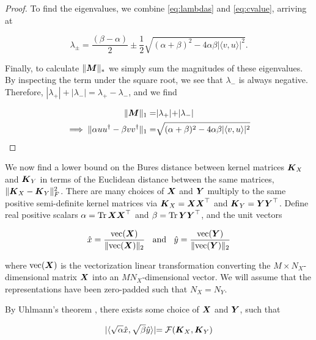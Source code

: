 \begin{proof}
To find the eigenvalues, we combine  \cref{eq:lambdas} and \cref{eq:cvalue}, arriving at 

\begin{equation}\label{eq:rank1-eigenvalues}
\lambda_{\pm} = \frac{(\beta - \alpha)}{2} \pm \frac{1}{2} \sqrt{(\alpha + \beta)^2 - 4 \alpha \beta \lvert \langle v,u \rangle \lvert^2}.
\end{equation}

Finally, to calculate $\| \boldsymbol{M}\|_*$ we simply sum the magnitudes of these eigenvalues. 
By inspecting the term under the square root, we see that $\lambda_-$ is always negative.  
Therefore, $|\lambda_+| + |\lambda_-| = \lambda_+ - \lambda_-$, and we find

\begin{equation}
\begin{split}
\| \boldsymbol{M}\|_1 =& \lvert \lambda_+ \lvert + \lvert \lambda_- \lvert \\
\implies \| \alpha u u^{\dag} - \beta v v^{\dag} \|_1 =& \sqrt{(\alpha + \beta)^2 - 4 \alpha \beta \lvert \langle v,u \rangle \lvert^2}
\end{split}
\end{equation}
\end{proof}

We now find a lower bound on the Bures distance between kernel matrices $\boldsymbol{K}_X$ and $\boldsymbol{K}_Y$ in terms of the Euclidean distance between the same matrices, $\|\boldsymbol{K}_X - \boldsymbol{K}_Y \|_F^2 $.
There are many choices of $\boldsymbol{X}$ and $\boldsymbol{Y}$ multiply to the same positive semi-definite kernel matrices via $\boldsymbol{K}_X = \boldsymbol{X} \boldsymbol{X}^\top$ and $\boldsymbol{K}_Y = \boldsymbol{Y} \boldsymbol{Y}^\top$.
Define real positive scalars $\alpha = \operatorname*{Tr} \boldsymbol{X} \boldsymbol{X}^\top$ and $\beta = \operatorname*{Tr} \boldsymbol{Y} \boldsymbol{Y}^\top$, and the unit vectors 

\begin{equation}
    \hat{x} = \frac{\text{vec}(\boldsymbol{X})}{\|\text{vec}(\boldsymbol{X})\|_2}  \:\:\:\: \text{and} \:\:\:\: \hat{y} = \frac{\text{vec}(\boldsymbol{Y})}{\|\text{vec}(\boldsymbol{Y})\|_2} 
\end{equation}

where $\text{vec}(\boldsymbol{X})$ is the vectorization linear transformation converting the $M \times N_X$-dimensional matrix $\boldsymbol{X}$ into an $MN_X$-dimensional vector.   
We will assume that the representations have been zero-padded such that $N_X = N_Y$.

By Uhlmann's theorem \cite{watrous2018}, there exists some choice of $\boldsymbol{X}$ and $\boldsymbol{Y}$, such that 

\begin{equation}
    \lvert \langle  \sqrt{\alpha} \hat{x}, \sqrt{\beta} \hat{y}  \rangle \lvert = \mathcal{F}(\boldsymbol{K}_X,\boldsymbol{K}_Y)
\end{equation}

